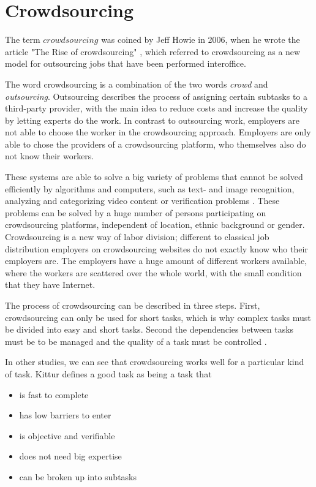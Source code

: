 \newpage
\section{Crowdsourcing}

The term $crowdsourcing$ was coined by Jeff Howie in 2006, when he wrote the article "The Rise of crowdsourcing" \cite{Howie:2006}, which referred to crowdsourcing as a new model for outsourcing jobs that have been performed interoffice.

The word crowdsourcing is a combination of the two words \textit{crowd} and \textit{outsourcing}. Outsourcing describes the process of assigning certain subtasks to a third-party provider, with the main idea to reduce costs and increase the quality by letting experts do the work.
In contrast to outsourcing work, employers are not able to choose the worker in the crowdsourcing approach. Employers are only able to chose the providers of a crowdsourcing platform, who themselves also do not know their workers.

These systems are able to solve a big variety of problems that cannot be solved efficiently by algorithms and computers, such as text- and image recognition, analyzing and categorizing video content or verification problems \cite{Howie:2006}. These problems can be solved by a huge number of persons participating on crowdsourcing platforms, independent of location, ethnic background or gender.
Crowdsourcing is a new way of labor division; different to classical job distribution employers on crowdsourcing websites do not exactly know who their employers are. The employers have a huge amount of different workers available, where the workers are scattered over the whole world, with the small condition that they have Internet.

The process of crowdsourcing can be described in three steps. First, crowdsourcing can only be used for short tasks, which is why complex tasks must be divided into easy and short tasks. Second the dependencies between tasks must be to be managed and the quality  of a task must be controlled \cite{Kittur:2011, Liu:2013}.

In other studies, we can see that crowdsourcing works well for a particular kind of task. Kittur \cite{Kittur:2010} defines a good task as being a task that
\begin{itemize}
    \item is fast to complete
    \item has low barriers to enter
    \item is objective and verifiable
    \item does not need big expertise
    \item can be broken up into subtasks
\end{itemize}


